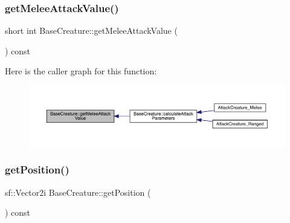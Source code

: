 \mbox{\label{class_base_creature_a7b4f974b77953aea8f4c698e6e21c500}} 
\subsubsection{\texorpdfstring{get\+Melee\+Attack\+Value()}{getMeleeAttackValue()}}
{\footnotesize\ttfamily short int Base\+Creature\+::get\+Melee\+Attack\+Value (\begin{DoxyParamCaption}{ }\end{DoxyParamCaption}) const}

Here is the caller graph for this function\+:
\nopagebreak
\begin{figure}[H]
\begin{center}
\leavevmode
\includegraphics[width=350pt]{class_base_creature_a7b4f974b77953aea8f4c698e6e21c500_icgraph}
\end{center}
\end{figure}
\mbox{\label{class_base_creature_a00ebdc186dd6d3c0ef3c3d1262d4363f}} 
\subsubsection{\texorpdfstring{get\+Position()}{getPosition()}}
{\footnotesize\ttfamily sf\+::\+Vector2i Base\+Creature\+::get\+Position (\begin{DoxyParamCaption}{ }\end{DoxyParamCaption}) const}

